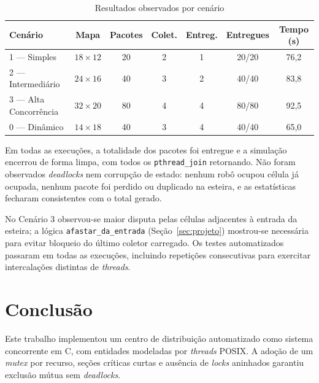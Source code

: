 \documentclass[12pt]{article}
\begin{document}
\begin{table}[ht]
\centering
\caption{Resultados observados por cenário}
\label{tab:resultados}
\small
\begin{tabular}{lcccccc}
\toprule
\textbf{Cenário} & \textbf{Mapa} & \textbf{Pacotes} & \textbf{Colet.} &
\textbf{Entreg.} & \textbf{Entregues} & \textbf{Tempo (s)} \\
\midrule
1 --- Simples           & $18\times12$ & 20 & 2 & 1 & 20/20 & 76,2 \\
2 --- Intermediário     & $24\times16$ & 40 & 3 & 2 & 40/40 & 83,8 \\
3 --- Alta Concorrência & $32\times20$ & 80 & 4 & 4 & 80/80 & 92,5 \\
0 --- Dinâmico          & $14\times18$ & 40 & 3 & 4 & 40/40 & 65,0 \\
\bottomrule
\end{tabular}
\end{table}

Em todas as execuções, a totalidade dos pacotes foi entregue e a simulação
encerrou de forma limpa, com todos os \texttt{pthread\_join} retornando.
Não foram observados \textit{deadlocks} nem corrupção de estado: nenhum robô
ocupou célula já ocupada, nenhum pacote foi perdido ou duplicado na esteira,
e as estatísticas fecharam consistentes com o total gerado.

No Cenário 3 observou-se maior disputa pelas células adjacentes à entrada da
esteira; a lógica \texttt{afastar\_da\_entrada} (Seção~\ref{sec:projeto})
mostrou-se necessária para evitar bloqueio do último coletor carregado.  Os
testes automatizados passaram em todas as execuções, incluindo repetições
consecutivas para exercitar intercalações distintas de \textit{threads}.

\section{Conclusão}
\label{sec:conclusao}

Este trabalho implementou um centro de distribuição automatizado como sistema
concorrente em C, com entidades modeladas por \textit{threads} POSIX. A adoção
de um \textit{mutex} por recurso, seções críticas curtas e ausência de
\textit{locks} aninhados garantiu exclusão mútua sem \textit{deadlocks}.
\end{document}
